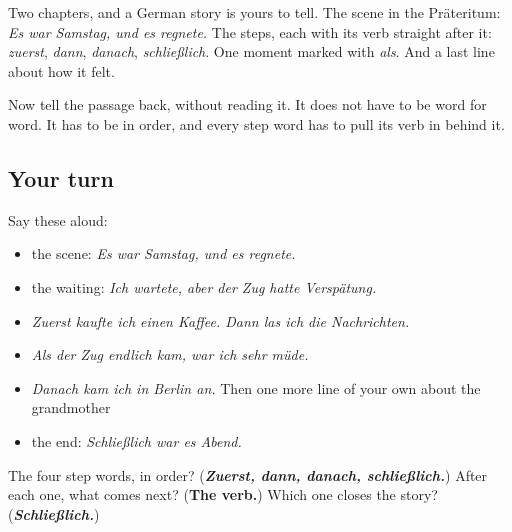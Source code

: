 \begin{grammarlens}[title={What you've built}]
Two chapters, and a German story is yours to tell. The scene in the Präteritum: \emph{Es war Samstag, und es regnete.} The steps, each with its verb straight after it: \emph{zuerst}, \emph{dann}, \emph{danach}, \emph{schließlich}. One moment marked with \emph{als}. And a last line about how it felt.

Now tell the passage back, without reading it. It does not have to be word for word. It has to be in order, and every step word has to pull its verb in behind it.
\end{grammarlens}

\subsection*{Your turn}
Say these aloud:

\begin{itemize}
\raggedright
  \item the scene: \emph{Es war Samstag, und es regnete.}
  \item the waiting: \emph{Ich wartete, aber der Zug hatte Verspätung.}
  \item \emph{Zuerst kaufte ich einen Kaffee. Dann las ich die Nachrichten.}
  \item \emph{Als der Zug endlich kam, war ich sehr müde.}
  \item \emph{Danach kam ich in Berlin an.} Then one more line of your own about the grandmother
  \item the end: \emph{Schließlich war es Abend.}
\end{itemize}

\begin{tcolorbox}[breakable,colback=teal!4,colframe=teal!35!black,title={Before you move on}]
The four step words, in order? (\emph{\textbf{Zuerst, dann, danach, schließlich.}}) After each one, what comes next? (\textbf{The verb.}) Which one closes the story? (\emph{\textbf{Schließlich.}})
\end{tcolorbox}

